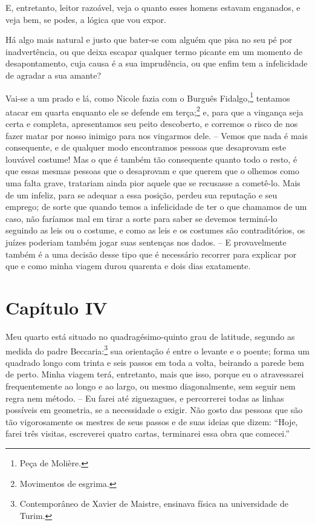 E, entretanto, leitor razoável, veja o quanto esses homens estavam
enganados, e veja bem, se podes, a lógica que vou expor.

 Há algo mais natural e justo que bater-se com alguém que pisa no seu pé
por inadvertência, ou que deixa escapar qualquer termo picante em um
momento de desapontamento, cuja causa é a sua imprudência, ou que enfim
tem a infelicidade de agradar a sua amante?

 Vai-se a um prado e lá, como Nicole fazia com o Burguês
Fidalgo,\footnote{ Peça de Molière.} tentamos atacar em quarta
enquanto ele se defende em terça;\footnote{ Movimentos de esgrima.} 
e, para que a vingança seja certa e completa, apresentamos seu
peito descoberto, e corremos o risco de nos fazer matar por nosso
inimigo para nos vingarmos dele. -- Vemos que nada é mais consequente,
e de qualquer modo encontramos pessoas que desaprovam este louvável
costume! Mas o que é também tão consequente quanto todo o resto, é que
essas mesmas pessoas que o desaprovam e que querem que o olhemos como
uma falta grave, tratariam ainda pior aquele que se recusasse a
cometê-lo. Mais de um infeliz, para se adequar a essa posição, perdeu
sua reputação e seu emprego; de sorte que quando temos a infelicidade
de ter o que chamamos de um caso, não faríamos mal em tirar a sorte
para saber se devemos terminá-lo seguindo as leis ou o costume, e como
as leis e os costumes são contraditórios, os juízes poderiam também
jogar suas sentenças nos dados. -- E provavelmente também é a uma
decisão desse tipo que é necessário recorrer para explicar por que e
como minha viagem durou quarenta e dois dias exatamente.

\section*{Capítulo IV}

 Meu quarto está situado no quadragésimo-quinto grau de latitude,
segundo as medida do padre Beccaria:\footnote{ Contemporâneo de Xavier
de Maistre, ensinava física na universidade de Turim.} sua
orientação é entre o levante e o poente; forma um quadrado longo com
trinta e seis passos em toda a volta, beirando a parede bem de perto.
Minha viagem terá, entretanto, mais que isso, porque eu o atravessarei
frequentemente ao longo e ao largo, ou mesmo diagonalmente, sem seguir
nem regra nem método. -- Eu farei até ziguezagues, e percorrerei todas
as linhas possíveis em geometria, se a necessidade o exigir. Não gosto
das pessoas que são tão vigorosamente os mestres de seus passos e de
suas ideias que dizem: ``Hoje, farei três visitas, escreverei quatro
cartas, terminarei essa obra que comecei.''

